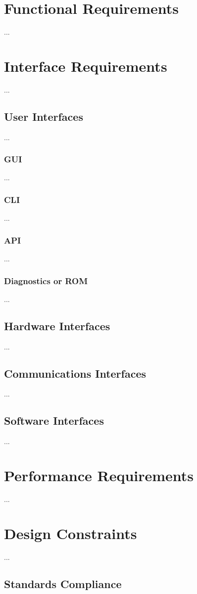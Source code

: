 \documentclass[]{article}
\begin{document}
\section{Functional Requirements}
... 



\section{Interface Requirements}
...
\subsection{User Interfaces}
...
\subsubsection {GUI}
...
\subsubsection { CLI}
...
\subsubsection {API}
... 
\subsubsection {Diagnostics or ROM}
...

\subsection{Hardware Interfaces}
...
\subsection{Communications Interfaces}
... 
\subsection{Software Interfaces}
... 
\section{Performance Requirements}
... 
\section{Design Constraints}
... 
\subsection{ Standards Compliance}
\end{document}
